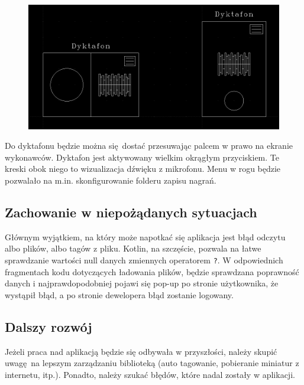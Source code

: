 \begin{figure}[H]
	\centering
	\includegraphics[width=1\textwidth]{images/mockup_dyktafon.png}
	\caption{}
\end{figure}

Do dyktafonu będzie można się dostać przesuwając palcem w prawo na ekranie wykonawców. Dyktafon jest aktywowany wielkim okrągłym przyciskiem. Te kreski obok niego to wizualizacja dźwięku z mikrofonu. Menu w rogu będzie pozwalało na m.in. skonfigurowanie folderu zapisu nagrań.

\subsection{Zachowanie w niepożądanych sytuacjach}

Głównym wyjątkiem, na który może napotkać się aplikacja jest błąd odczytu albo plików, albo tagów z pliku. Kotlin, na szczęście, pozwala na łatwe sprawdzanie wartości null danych zmiennych operatorem \texttt{?}. W odpowiednich fragmentach kodu dotyczących ładowania plików, będzie sprawdzana poprawność danych i najprawdopodobniej pojawi się pop-up po stronie użytkownika, że wystąpił błąd, a po stronie dewelopera błąd zostanie logowany.

\subsection{Dalszy rozwój}

Jeżeli praca nad aplikacją będzie się odbywała w przyszłości, należy skupić uwagę na lepszym zarządzaniu biblioteką (auto tagowanie, pobieranie miniatur z internetu, itp.). Ponadto, należy szukać błędów, które nadal zostały w aplikacji.

